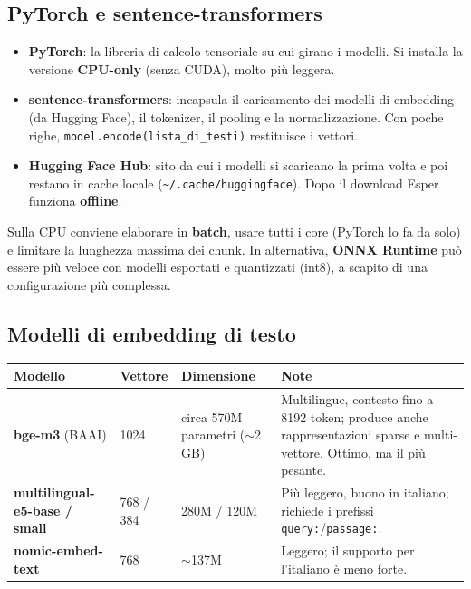 \documentclass[11pt,a4paper]{article}
\newcommand{\code}[1]{\texttt{\small #1}}
\newcommand{\hd}[1]{\textbf{\color{amber}#1}}
\newcommand{\tablehead}{\rowcolor{paper}}
\begin{document}
\subsection{PyTorch e sentence-transformers}
\begin{itemize}
  \item \textbf{PyTorch}: la libreria di calcolo tensoriale su cui girano i modelli. Si installa la versione \textbf{CPU-only} (senza CUDA), molto più leggera.
  \item \textbf{sentence-transformers}: incapsula il caricamento dei modelli di embedding (da Hugging Face), il tokenizer, il pooling e la normalizzazione. Con poche righe, \code{model.encode(lista\_di\_testi)} restituisce i vettori.
  \item \textbf{Hugging Face Hub}: sito da cui i modelli si scaricano la prima volta e poi restano in cache locale (\code{\textasciitilde/.cache/huggingface}). Dopo il download Esper funziona \textbf{offline}.
\end{itemize}
Sulla CPU conviene elaborare in \textbf{batch}, usare tutti i core (PyTorch lo fa da solo) e limitare la lunghezza massima dei chunk. In alternativa, \textbf{ONNX Runtime} può essere più veloce con modelli esportati e quantizzati (int8), a scapito di una configurazione più complessa.

\subsection{Modelli di embedding di testo}

\begin{center}
\small
\begin{tabularx}{\textwidth}{@{}L{3.3cm}L{1.9cm}L{2.6cm}X@{}}
\toprule
\tablehead \hd{Modello} & \hd{Vettore} & \hd{Dimensione} & \hd{Note} \\
\midrule
\textbf{bge-m3} (BAAI) & 1024 & circa 570M parametri ($\sim$2 GB) & Multilingue, contesto fino a 8192 token; produce anche rappresentazioni sparse e multi-vettore. Ottimo, ma il più pesante. \\
\textbf{multilingual-e5-base / small} & 768 / 384 & 280M / 120M & Più leggero, buono in italiano; richiede i prefissi \code{query:}/\code{passage:}. \\
\textbf{nomic-embed-text} & 768 & $\sim$137M & Leggero; il supporto per l'italiano è meno forte. \\
\bottomrule
\end{tabularx}
\end{center}
\end{document}
